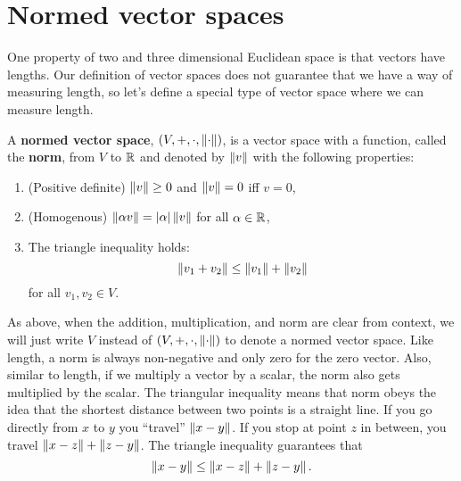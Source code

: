\section{Normed vector spaces}

One property of two and three dimensional Euclidean space is that
vectors have lengths. Our definition of vector spaces does not
guarantee that we have a way of measuring length, so let's define a
special type of vector space where we can measure length. 
\begin{definition}
  A \textbf{normed vector space}, $(V,+,\cdot, \left\Vert {\cdot} \right\Vert)$, is a
  vector space with a function, called the \textbf{norm}, from $V$ to
  $\mathbb{R}$ and denoted by $\left\Vert {v} \right\Vert$ with the following properties:
  \begin{enumerate}
  \item (Positive definite) $\left\Vert {v} \right\Vert \geq 0$ and $\left\Vert {v} \right\Vert = 0$ iff $v = 0$,
  \item (Homogenous) $\left\Vert {\alpha v} \right\Vert = |\alpha|\left\Vert {v} \right\Vert$ for all $\alpha \in \mathbb{R}$,
  \item The triangle inequality holds:
    \[ \left\Vert {v_1+v_2} \right\Vert \leq \left\Vert {v_1} \right\Vert + \left\Vert {v_2} \right\Vert \]
    for all $v_1, v_2 \in V$.
  \end{enumerate}
\end{definition}
As above, when the addition, multiplication,
and norm are clear from context, we will just write $V$ instead of
$(V,+,\cdot, \left\Vert {\cdot} \right\Vert)$ to denote a normed vector space. 
Like length, a norm is always non-negative and only zero for the zero
vector. Also, similar to length, if we multiply a vector by a scalar,
the norm also gets multiplied by the scalar. The triangular inequality
means that norm obeys the idea that the shortest distance between two
points is a straight line. If you go directly from $x$ to $y$ you
``travel'' $\left\Vert {x - y} \right\Vert$. If you stop at point $z$ in between, you travel
$\left\Vert {x - z} \right\Vert + \left\Vert {z - y} \right\Vert$. The triangle inequality guarantees that 
\[ \left\Vert {x-y} \right\Vert \leq \left\Vert {x - z} \right\Vert + \left\Vert {z - y} \right\Vert. \]


